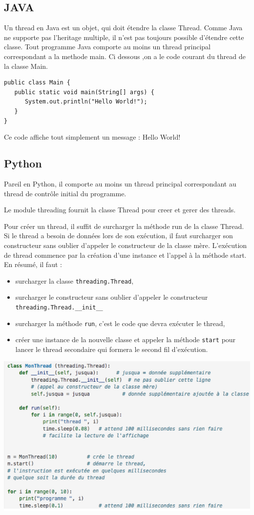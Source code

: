 \documentclass{article}
\begin{document}
\subsection{JAVA}
Un thread en Java est un objet, qui doit étendre la classe Thread. Comme Java ne supporte pas l'heritage multiple, il n'est pas toujours possible d'étendre cette classe.
Tout programme Java comporte au moins un thread principal correspondant a la methode main. 
Ci dessous ,on a le code courant du thread de la classe Main.

\begin{verbatim}
public class Main {
   public static void main(String[] args) {
      System.out.println("Hello World!");
   }
}
\end{verbatim}
Ce code affiche tout simplement un message : Hello World!

\subsection{Python}
Pareil en Python, il comporte au moins un thread principal correspondant au thread de contrôle initial du programme. 

Le module threading fournit la classe Thread pour creer et gerer des threads.

Pour créer un thread, il suffit de surcharger la méthode run de la classe Thread. Si le thread a besoin de données lors de son exécution, il faut surcharger son constructeur sans oublier d’appeler le constructeur de la classe mère. L’exécution de thread commence par la création d’une instance et l’appel à la méthode start. En résumé, il faut :

\begin{itemize}
\item surcharger la classe \verb|threading.Thread|,
\item surcharger le constructeur sans oublier d’appeler le constructeur \verb|threading.Thread.__init__|
\item surcharger la méthode \verb|run|, c’est le code que devra exécuter le thread,
\item créer une instance de la nouvelle classe et appeler la méthode \verb|start| pour lancer le thread secondaire qui formera le second fil d’exécution.
\end{itemize}
\begin{center}
  \includegraphics[scale=0.5]{thread.png}
\end{center}
\end{document}
